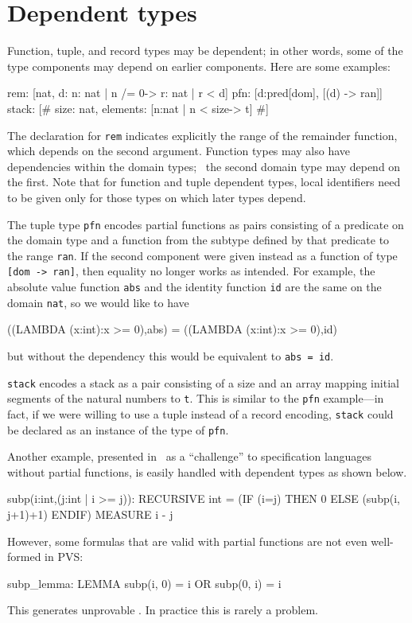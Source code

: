 
\section{Dependent types}\label{dependent-types}

Function, tuple, and record types may be dependent; in other words, some
of the type components may depend on earlier components.  Here are some
examples:
\begin{pvsex}
  rem: [nat, d: \setb{}n: nat | n /= 0\sete -> \setb{}r: nat | r < d\sete]
  pfn: [d:pred[dom], [(d) -> ran]]
  stack: [\# size: nat, elements: [\setb{}n:nat | n < size\sete -> t] \#]
\end{pvsex}
The declaration for \texttt{rem} indicates explicitly the range of the
remainder function, which depends on the second argument.  Function types
may also have dependencies within the domain types; \eg\ the second domain
type may depend on the first.  Note that for function and tuple dependent
types, local identifiers need to be given only for those types on which
later types depend.

The tuple type \texttt{pfn} encodes partial functions as pairs consisting
of a predicate on the domain type and a function from the subtype
defined by that predicate to the range \texttt{ran}.  If the second
component were given instead as a function of type \texttt{[dom -> ran]},
then equality no longer works as intended.  For example, the absolute
value function \texttt{abs} and the identity function \texttt{id} are the same
on the domain \texttt{nat}, so we would like to have
\begin{pvsex}
  ((LAMBDA (x:int):x >= 0),abs) = ((LAMBDA (x:int):x >= 0),id)
\end{pvsex}
%
but without the dependency this would be equivalent to \texttt{abs = id}.

\texttt{stack} encodes a stack as a pair consisting of a size and an array
mapping initial segments of the natural numbers to \texttt{t}.  This is
similar to the \texttt{pfn} example---in fact, if we were willing to use a
tuple instead of a record encoding, \texttt{stack} could be declared as an
instance of the type of \texttt{pfn}.

Another example, presented in~\cite{Cheng&Jones90} as a ``challenge'' to
specification languages without partial functions, is easily handled
with dependent types as shown below.
\begin{pvsex}
  subp(i:int,(j:int | i >= j)): RECURSIVE int =
       (IF (i=j) THEN 0 ELSE (subp(i, j+1)+1) ENDIF)
    MEASURE i - j
\end{pvsex}
However, some formulas that are valid with partial functions are not even
well-formed in PVS:
\begin{pvsex}
  subp_lemma: LEMMA subp(i, 0) = i OR subp(0, i) = i
\end{pvsex}
This generates unprovable \tccs.  In practice this is rarely a problem.

